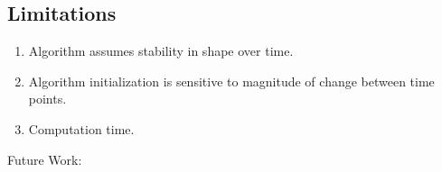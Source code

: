 \documentclass[11pt,reqno]{article}
\theoremstyle{definition}
\begin{document}
\subsection*{Limitations}

\begin{enumerate}
  \item Algorithm assumes stability in shape over time.
  \item Algorithm initialization is sensitive to magnitude of change between time points.
  \item Computation time.
\end{enumerate}

Future Work:

\nocite{*}
%
%
\printbibliography
\end{document}
